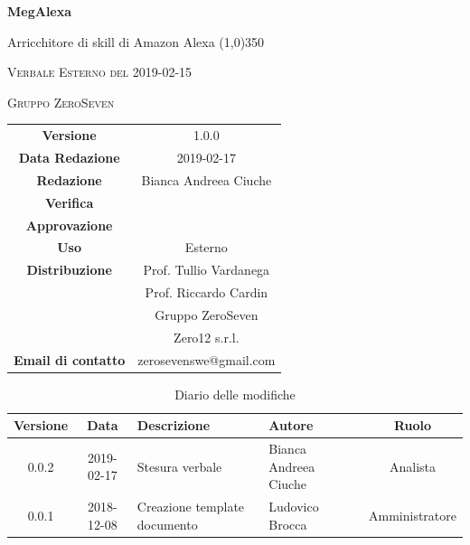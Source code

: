 \documentclass[a4paper,12pt]{article}
\author{Bianca Andreea Ciuche}
\date{2019-02-15}
\begin{document}
	\begin{titlepage}
		\centering
		{\huge\bfseries MegAlexa\par}
		Arricchitore di skill di Amazon Alexa
		\line(1,0){350} \\
		{\scshape\LARGE Verbale Esterno del 2019-02-15 \par}
		\vspace{1cm}
		{\scshape Gruppo ZeroSeven \par}
		\logo
		\begin{tabular}{c|c}
			{\hfill \textbf{Versione}} 			& 1.0.0				\\
			{\hfill\textbf{Data Redazione}} 	& 2019-02-17		\\ 
			{\hfill\textbf{Redazione}} 			&  		Bianca Andreea Ciuche		\\ 
			{\hfill\textbf{Verifica}} 				&  	  	\\ 
			{\hfill\textbf{Approvazione}} 		&  		\\ 
			{\hfill\textbf{Uso}} 					& 	Esterno	\\ 
			{\hfill\textbf{Distribuzione}} 			& 			Prof. Tullio Vardanega \\ & Prof. Riccardo Cardin \\ & Gruppo ZeroSeven \\ & Zero12 s.r.l.	\\ 
			{\hfill\textbf{Email di contatto}} & zerosevenswe@gmail.com \\
		\end{tabular}
	\end{titlepage}
	
	
	
	\label{LastFrontPage}
	
	
	\newpage
	\cleardoublepage
	\begin{table}[tbph]
		\centering
		\begin{tabularx}{\textwidth}{|c|c|X|X|c|}
			\hline
			\textbf{Versione} & \textbf{Data} & \textbf{Descrizione} & \textbf{Autore} & \textbf{Ruolo} \\
			\hline
			0.0.2 & 2019-02-17 & Stesura verbale &Bianca Andreea Ciuche  & Analista \\
			\hline
			0.0.1 & 2018-12-08 & Creazione template documento & Ludovico Brocca & Amministratore\\
			\hline
		\end{tabularx}
		\caption{Diario delle modifiche}
	\end{table}
	\cleardoublepage
	\pagestyle{mymain}
	
\end{document}
